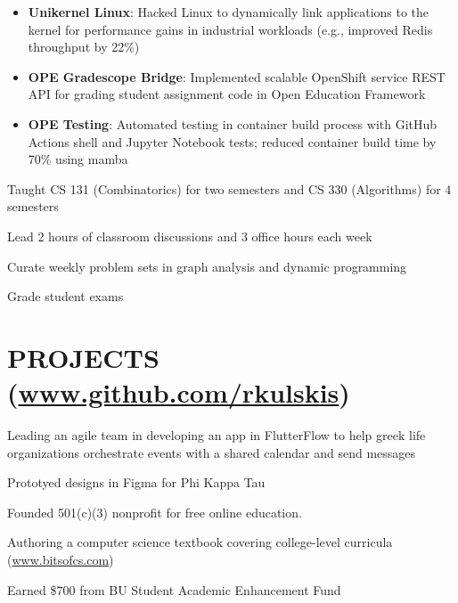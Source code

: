 \documentclass[10pt]{article}
\begin{document}
\begin{FlushLeft}
\begin{itemize}
\item \textbf{Unikernel Linux}: Hacked Linux to dynamically link applications to the kernel for performance gains in industrial workloads (e.g., improved Redis throughput by 22\%)
\item \textbf{OPE Gradescope Bridge}: Implemented scalable OpenShift service REST API for grading student assignment code in Open Education Framework
\item \textbf{OPE Testing}: Automated testing in container build process with GitHub Actions shell and Jupyter Notebook tests; reduced container build time by 70\% using mamba
\end{itemize}

  \begin{itemize}{
    \item Taught CS 131 (Combinatorics) for two semesters and CS 330 (Algorithms) for 4 semesters
    \item Lead 2 hours of classroom discussions and 3 office hours each week
    \item Curate weekly problem sets in graph analysis and dynamic programming
    \item Grade student exams
    }
  \end{itemize}
  
  \section{PROJECTS (\href{www.github.com/rkulskis}{www.github.com/rkulskis})}
  \begin{itemize}{
    \item Leading an agile team in developing an app in FlutterFlow to help greek life organizations orchestrate events with a shared calendar and send messages
    \item Prototyed designs in Figma for Phi Kappa Tau
  }
  \end{itemize}
  \begin{itemize}{
    \item Founded 501(c)(3) nonprofit for free online education.
    \item Authoring a computer science textbook covering college-level curricula (\href{www.bitsofcs.com}{www.bitsofcs.com})
    \item Earned \$700 from BU Student Academic Enhancement Fund
    }
  \end{itemize}


\end{FlushLeft}
\end{document}
